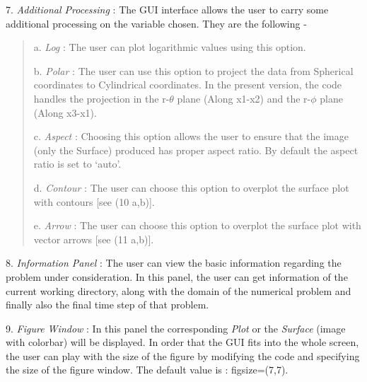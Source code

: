 \documentclass[letterpaper,10pt,english]{sphinxmanual}
\begin{document}
7. \emph{Additional Processing} : The GUI interface allows the user to
carry some additional processing on the variable chosen. They are the
following -
\begin{quote}

a. \emph{Log} : The user can plot logarithmic values using this
option.

b. \emph{Polar} : The user can use this option to project the data from
Spherical coordinates to Cylindrical coordinates. In the present
version, the code handles the projection in the r-\(\theta\) plane
(Along x1-x2) and the r-\(\phi\) plane (Along x3-x1).

c. \emph{Aspect} : Choosing this option allows the user to ensure that the
image (only the Surface) produced has proper aspect ratio. By default
the aspect ratio is set to `auto'.

d. \emph{Contour} : The user can choose this option to overplot the
surface
plot with contours {[}see (10 a,b){]}.

e. \emph{Arrow} : The user can choose this option to overplot the surface
plot with vector arrows {[}see (11 a,b){]}.
\end{quote}

8. \emph{Information Panel} : The user can view the basic information
regarding the problem under consideration. In this panel, the user
can get information of the current working directory, along with the
domain of the numerical problem and finally also the final time
step of that problem.

9. \emph{Figure Window} : In this panel the corresponding \emph{Plot} or the \emph{Surface} (image with colorbar) will be displayed. In
order that the GUI fits into the whole screen, the user can play with
the size of the figure by modifying the code and specifying the size
of the figure window. The default value is : figsize=(7,7).
\end{document}
